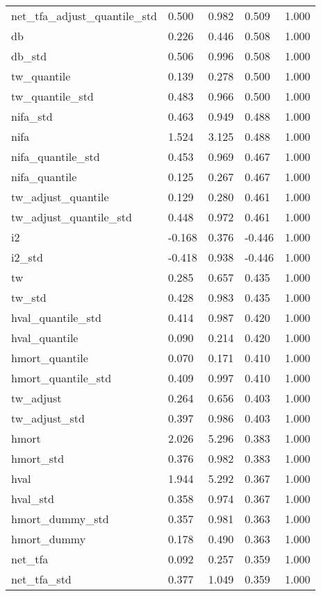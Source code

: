 \documentclass[12pt,a4paper]{article}
\begin{document}
\begin{singlespace}
\begin{ThreePartTable}
\begin{longtable}{l C{2cm} C{2cm} C{2cm} C{2cm} }
  net\_tfa\_adjust\_quantile\_std & 0.500 & 0.982 & 0.509 & 1.000 \\ 
  db & 0.226 & 0.446 & 0.508 & 1.000 \\ 
  db\_std & 0.506 & 0.996 & 0.508 & 1.000 \\ 
  tw\_quantile & 0.139 & 0.278 & 0.500 & 1.000 \\ 
  tw\_quantile\_std & 0.483 & 0.966 & 0.500 & 1.000 \\ 
  nifa\_std & 0.463 & 0.949 & 0.488 & 1.000 \\ 
  nifa & 1.524 & 3.125 & 0.488 & 1.000 \\ 
  nifa\_quantile\_std & 0.453 & 0.969 & 0.467 & 1.000 \\ 
  nifa\_quantile & 0.125 & 0.267 & 0.467 & 1.000 \\ 
  tw\_adjust\_quantile & 0.129 & 0.280 & 0.461 & 1.000 \\ 
  tw\_adjust\_quantile\_std & 0.448 & 0.972 & 0.461 & 1.000 \\ 
  i2 & -0.168 & 0.376 & -0.446 & 1.000 \\ 
  i2\_std & -0.418 & 0.938 & -0.446 & 1.000 \\ 
  tw & 0.285 & 0.657 & 0.435 & 1.000 \\ 
  tw\_std & 0.428 & 0.983 & 0.435 & 1.000 \\ 
  hval\_quantile\_std & 0.414 & 0.987 & 0.420 & 1.000 \\ 
  hval\_quantile & 0.090 & 0.214 & 0.420 & 1.000 \\ 
  hmort\_quantile & 0.070 & 0.171 & 0.410 & 1.000 \\ 
  hmort\_quantile\_std & 0.409 & 0.997 & 0.410 & 1.000 \\ 
  tw\_adjust & 0.264 & 0.656 & 0.403 & 1.000 \\ 
  tw\_adjust\_std & 0.397 & 0.986 & 0.403 & 1.000 \\ 
  hmort & 2.026 & 5.296 & 0.383 & 1.000 \\ 
  hmort\_std & 0.376 & 0.982 & 0.383 & 1.000 \\ 
  hval & 1.944 & 5.292 & 0.367 & 1.000 \\ 
  hval\_std & 0.358 & 0.974 & 0.367 & 1.000 \\ 
  hmort\_dummy\_std & 0.357 & 0.981 & 0.363 & 1.000 \\ 
  hmort\_dummy & 0.178 & 0.490 & 0.363 & 1.000 \\ 
  net\_tfa & 0.092 & 0.257 & 0.359 & 1.000 \\ 
  net\_tfa\_std & 0.377 & 1.049 & 0.359 & 1.000 \\ 

\end{longtable}
\end{ThreePartTable}
\end{singlespace}
\end{document}
